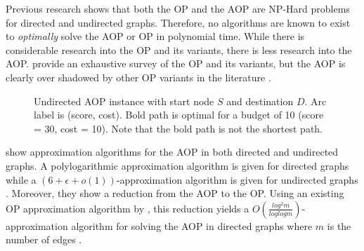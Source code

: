 \documentclass[11pt]{article}
\begin{document}
Previous research shows that both the OP and the AOP are NP-Hard problems for directed and undirected graphs. Therefore, no algorithms are known to exist to \emph{optimally} solve the AOP or OP in polynomial time. While there is considerable research into the OP and its variants, there is less research into the AOP. \citeauthor{gunawan2016orienteering} provide an exhaustive survey of the OP and its variants, but the AOP is clearly over shadowed by other OP variants in the literature \cite{gunawan2016orienteering}.

\begin{figure}[h]
\begin{center}
\end{center}
\caption{Undirected AOP instance with start node $S$ and destination $D$. Arc label is (score, cost). Bold path is optimal for a budget of 10 (score = 30, cost = 10). Note that the bold path is not the shortest path.\label{fig:aop-example}}
\end{figure}

 
\citeauthor{gavalas2015approximation} show approximation algorithms for the AOP in both directed and undirected graphs. A polylogarithmic approximation algorithm is given for directed graphs while a $(6 + \epsilon + o(1))$-approximation algorithm is given for undirected graphs \cite{gavalas2015approximation}. Moreover, they show a reduction from the AOP to the OP. Using an existing OP approximation algorithm by \citeauthor{nagarajan2011directed}, this reduction yields a $O(\frac{log^2m}{loglogm})$-approximation algorithm for solving the AOP in directed graphs where $m$ is the number of edges \cite{gavalas2015approximation}.
\end{document}
